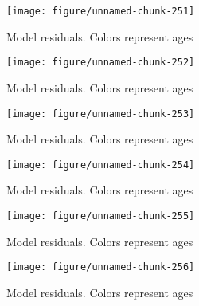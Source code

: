 \documentclass[a4paper]{article}\usepackage{graphicx, color}
\makeatletter
\def\maxwidth{ %
  \ifdim\Gin@nat@width>\linewidth
    \linewidth
  \else
    \Gin@nat@width
  \fi
}
\newenvironment{knitrout}{}{} %
\makeatother
\begin{document}
\begin{knitrout}
\color{fgcolor}\begin{figure}[H]


{\centering \texttt{[image: figure/unnamed-chunk-251]} 

}

\caption[Model residuals]{Model residuals. Colors represent ages\label{fig:unnamed-chunk-251}}
\end{figure}
\begin{figure}[H]


{\centering \texttt{[image: figure/unnamed-chunk-252]} 

}

\caption[Model residuals]{Model residuals. Colors represent ages\label{fig:unnamed-chunk-252}}
\end{figure}
\begin{figure}[H]


{\centering \texttt{[image: figure/unnamed-chunk-253]} 

}

\caption[Model residuals]{Model residuals. Colors represent ages\label{fig:unnamed-chunk-253}}
\end{figure}
\begin{figure}[H]


{\centering \texttt{[image: figure/unnamed-chunk-254]} 

}

\caption[Model residuals]{Model residuals. Colors represent ages\label{fig:unnamed-chunk-254}}
\end{figure}
\begin{figure}[H]


{\centering \texttt{[image: figure/unnamed-chunk-255]} 

}

\caption[Model residuals]{Model residuals. Colors represent ages\label{fig:unnamed-chunk-255}}
\end{figure}
\begin{figure}[H]


{\centering \texttt{[image: figure/unnamed-chunk-256]} 

}

\caption[Model residuals]{Model residuals. Colors represent ages\label{fig:unnamed-chunk-256}}
\end{figure}
\begin{figure}[H]



\end{figure}
\end{knitrout}
\end{document}
